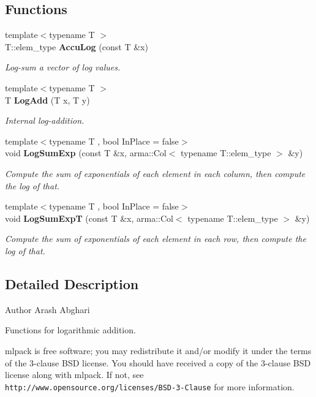 \subsection*{Functions}
\begin{DoxyCompactItemize}
\item 
{\footnotesize template$<$typename T $>$ }\\T\+::elem\+\_\+type \textbf{ Accu\+Log} (const T \&x)
\begin{DoxyCompactList}\small\item\em Log-\/sum a vector of log values. \end{DoxyCompactList}\item 
{\footnotesize template$<$typename T $>$ }\\T \textbf{ Log\+Add} (T x, T y)
\begin{DoxyCompactList}\small\item\em Internal log-\/addition. \end{DoxyCompactList}\item 
{\footnotesize template$<$typename T , bool In\+Place = false$>$ }\\void \textbf{ Log\+Sum\+Exp} (const T \&x, arma\+::\+Col$<$ typename T\+::elem\+\_\+type $>$ \&y)
\begin{DoxyCompactList}\small\item\em Compute the sum of exponentials of each element in each column, then compute the log of that. \end{DoxyCompactList}\item 
{\footnotesize template$<$typename T , bool In\+Place = false$>$ }\\void \textbf{ Log\+Sum\+ExpT} (const T \&x, arma\+::\+Col$<$ typename T\+::elem\+\_\+type $>$ \&y)
\begin{DoxyCompactList}\small\item\em Compute the sum of exponentials of each element in each row, then compute the log of that. \end{DoxyCompactList}\end{DoxyCompactItemize}


\subsection{Detailed Description}
\begin{DoxyAuthor}{Author}
Arash Abghari
\end{DoxyAuthor}
Functions for logarithmic addition.

mlpack is free software; you may redistribute it and/or modify it under the terms of the 3-\/clause B\+SD license. You should have received a copy of the 3-\/clause B\+SD license along with mlpack. If not, see {\tt http\+://www.\+opensource.\+org/licenses/\+B\+S\+D-\/3-\/\+Clause} for more information. 